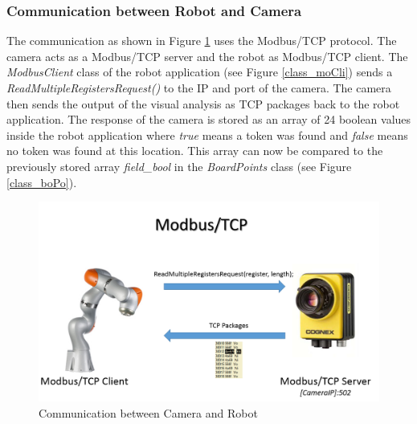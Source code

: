 \documentclass[a4paper]{spie}  %
\begin{document}
\begin{large}
\subsubsection{Communication between Robot and Camera}
\label{commu}
The communication as shown in Figure \ref{communication} uses the Modbus/TCP protocol. The camera acts as a Modbus/TCP server and the robot as Modbus/TCP client. The \emph{ModbusClient} class of the robot application (see Figure \ref{class_moCli})  sends a \emph{ReadMultipleRegistersRequest()} to the IP and port of the camera. The camera then sends the output of the visual analysis as TCP packages back to the robot application. The response of the camera is stored as an array of 24 boolean values inside the robot application where \emph{true} means a token was found and \emph{false} means no token was found at this location. This array can now be compared to the previously stored array \emph{field\_bool} in the \emph{BoardPoints} class (see Figure \ref{class_boPo}).
\begin{figure}[h]
\includegraphics[width=15cm]{images/communication.png}
\centering
\caption{Communication between Camera and Robot}
\label{communication}
\end{figure}

\end{large}
\end{document}
